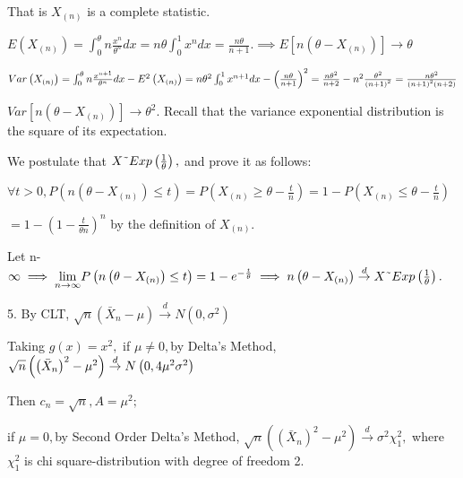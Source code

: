 \documentclass{article}
\begin{document}
That is $X_{\left( n\right) }$ is a complete statistic.

$E\left( X_{\left( n\right) }\right) =\int_{0}^{\theta }n\frac{x^{n}}{\theta
^{n}}dx=n\theta \int_{0}^{1}x^{n}dx=\frac{n\theta }{n+1}.\implies E\left[
n\left( \theta -X_{\left( n\right) }\right) \right] \rightarrow \theta $

$Var\left( X_{\left( n\right) }\right) =\int_{0}^{\theta }n\frac{x^{n+1}}{%
\theta ^{n}}dx-E^{2}\left( X_{\left( n\right) }\right) =n\theta
^{2}\int_{0}^{1}x^{n+1}dx-\left( \frac{n\theta }{n+1}\right) ^{2}=\frac{%
n\theta ^{2}}{n+2}-n^{2}\frac{\theta ^{2}}{\left( n+1\right) ^{2}}=\frac{%
n\theta ^{2}}{\left( n+1\right) ^{2}\left( n+2\right) }$

$Var\left[ n\left( \theta -X_{\left( n\right) }\right) \right] \rightarrow
\theta ^{2}.$ Recall that the variance exponential distribution is the
square of its expectation.

We postulate that $X\symbol{126}Exp\left( \frac{1}{\theta }\right) ,$ and
prove it as follows:

$\forall t>0,P\left( n\left( \theta -X_{\left( n\right) }\right) \leq
t\right) =P\left( X_{\left( n\right) }\geq \theta -\frac{t}{n}\right)
=1-P\left( X_{\left( n\right) }\leq \theta -\frac{t}{n}\right) $

$=1-\left( 1-\frac{t}{\theta n}\right) ^{n}$ by the definition of $X_{\left(
n\right) }.$

Let n-\TEXTsymbol{>}$\infty \implies \underset{n\rightarrow \infty }{\lim }%
P\left( n\left( \theta -X_{\left( n\right) }\right) \leq t\right) =1-e^{-%
\frac{t}{\theta }}\implies n\left( \theta -X_{\left( n\right) }\right) 
\overset{d}{\rightarrow }X\symbol{126}Exp\left( \frac{1}{\theta }\right) .$

5. By CLT, $\sqrt{n}\left( \bar{X}_{n}-\mu \right) \overset{d}{\rightarrow }%
N\left( 0,\sigma ^{2}\right) $

Taking $g\left( x\right) =x^{2},$ if $\mu \neq 0,$by Delta's Method, $\sqrt{n%
}\left( \left( \bar{X}_{n}\right) ^{2}-\mu ^{2}\right) \overset{d}{%
\rightarrow }N\left( 0,4\mu ^{2}\sigma ^{2}\right) $

Then $c_{n}=\sqrt{n},A=\mu ^{2};$

if $\mu =0,$by Second Order Delta's Method, $\sqrt{n}\left( \left( \bar{X}%
_{n}\right) ^{2}-\mu ^{2}\right) \overset{d}{\rightarrow }\sigma ^{2}\chi
_{1}^{2},$ where $\chi _{1}^{2}$ is chi square-distribution with degree of
freedom 2.

\qquad
\end{document}
